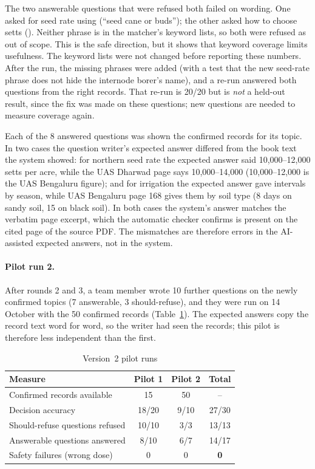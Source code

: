 The two answerable questions that were refused both failed on wording. One asked for seed
rate using  (``seed cane or buds''); the other asked how to
choose setts (). Neither phrase is in the matcher's keyword lists,
so both were refused as out of scope. This is the safe direction, but it shows that keyword
coverage limits usefulness. The keyword lists were not changed before reporting these
numbers. After the run, the missing phrases were added (with a test that the new seed-rate
phrase does not hide the internode borer's name), and a re-run answered both questions
from the right records. That re-run is 20/20 but is \emph{not} a held-out result, since the
fix was made on these questions; new questions are needed to measure coverage again.

Each of the 8 answered questions was shown the confirmed records for its topic. In two
cases the question writer's expected answer differed from the book text the system showed:
for northern seed rate the expected answer said 10,000--12,000 setts per acre, while the
UAS Dharwad page says 10,000--14,000 (10,000--12,000 is the UAS Bengaluru figure); and for
irrigation the expected answer gave intervals by season, while UAS Bengaluru page 168 gives
them by soil type (8 days on sandy soil, 15 on black soil). In both cases the system's
answer matches the verbatim page excerpt, which the automatic checker confirms is present
on the cited page of the source PDF. The mismatches are therefore errors in the
AI-assisted expected answers, not in the system.

\paragraph{Pilot run 2.} After rounds 2 and 3, a team member wrote 10 further questions on the
newly confirmed topics (7 answerable, 3 should-refuse), and they were run on 14 October with
the 50 confirmed records (Table~\ref{tab:v2b}). The expected answers copy the record text
word for word, so the writer had seen the records; this pilot is therefore less independent
than the first.

\begin{table}[h]
\centering
\caption{Version~2 pilot runs}
\label{tab:v2b}
\begin{tabular}{lccc}
\toprule
Measure & Pilot 1 & Pilot 2 & Total\\
\midrule
Confirmed records available & 15 & 50 & --\\
Decision accuracy & 18/20 & 9/10 & 27/30\\
Should-refuse questions refused & 10/10 & 3/3 & 13/13\\
Answerable questions answered & 8/10 & 6/7 & 14/17\\
Safety failures (wrong dose) & 0 & 0 & \textbf{0}\\
\bottomrule
\end{tabular}
\end{table}

